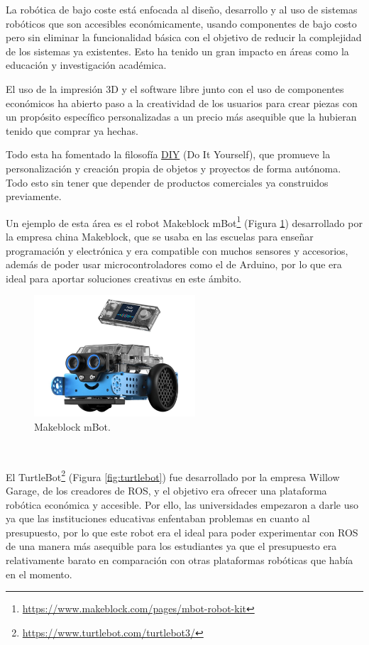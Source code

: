 La robótica de bajo coste está enfocada al diseño, desarrollo y al uso de sistemas robóticos que son accesibles económicamente, usando componentes de bajo costo pero sin eliminar la funcionalidad básica con el objetivo de reducir la complejidad de los sistemas ya existentes. Esto ha tenido un gran impacto en áreas como la educación y investigación académica.

El uso de la impresión 3D y el software libre junto con el uso de componentes económicos ha abierto paso a la creatividad de los usuarios para crear piezas con un propósito específico personalizadas a un precio más asequible que la hubieran tenido que comprar ya hechas.


Todo esta ha fomentado la filosofía \hyperlink{DIY}{DIY} (Do It Yourself), que promueve la personalización y creación propia de objetos y proyectos de forma autónoma. Todo esto sin tener que depender de productos comerciales ya construidos previamente.

Un ejemplo de esta área es el robot Makeblock mBot\footnote{\url{https://www.makeblock.com/pages/mbot-robot-kit}} (Figura \ref{fig:mbot-2}) desarrollado por la empresa china Makeblock, que se usaba en las escuelas para enseñar programación y electrónica y era compatible con muchos sensores y accesorios, además de poder usar microcontroladores como el de Arduino, por lo que era ideal para aportar soluciones creativas en este ámbito.

\begin{figure} [h!]
  \begin{center}
    \includegraphics[width=6cm]{figs/mbot-2.jpg}
  \end{center}
  \caption{Makeblock mBot.}
  \label{fig:mbot-2}
\end{figure}\


El TurtleBot\footnote{\url{https://www.turtlebot.com/turtlebot3/}} (Figura \ref{fig:turtlebot}) fue desarrollado por la empresa Willow Garage, de los creadores de ROS, y el objetivo era ofrecer una plataforma robótica económica y accesible. Por ello, las universidades empezaron a darle uso ya que las instituciones educativas enfentaban problemas en cuanto al presupuesto, por lo que este robot era el ideal para poder experimentar con ROS de una manera más asequible para los estudiantes ya que el presupuesto era relativamente barato en comparación con otras plataformas robóticas que había en el momento.


